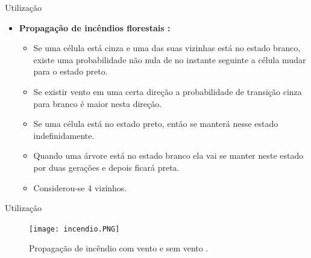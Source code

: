 \documentclass[compress, hide notes]{beamer}
\begin{document}
\begin{frame}{Utilização}
	
	\begin{itemize}
	
		\item \textbf{Propagação de incêndios florestais \cite{ufmg}:}
		
		\begin{itemize}
		
			\item Se uma célula está cinza e uma das suas vizinhas está no estado branco, existe uma probabilidade não nula de no instante seguinte a célula mudar para o estado preto.
			
			\bigskip
			
			\item Se existir vento em uma certa direção a probabilidade de transição cinza para branco é maior nesta direção.

			\bigskip
			
			\item Se uma célula está no estado preto, então se manterá nesse estado indefinidamente.
			
			\bigskip
			
			\item Quando uma árvore está no estado branco ela vai se manter neste estado por duas gerações e depois ficará preta.
			
			\bigskip
			
			\item Considerou-se 4 vizinhos.
		
		\end{itemize}
		
	\end{itemize}
	
\end{frame}

\begin{frame}{Utilização}
	
	\begin{figure}[h]
								
		\center
													
		\texttt{[image: incendio.PNG]}
		\caption{Propagação de incêndio com vento e sem vento \cite{ufmg}.}
							
	\end{figure}
	
\end{frame}
\end{document}

